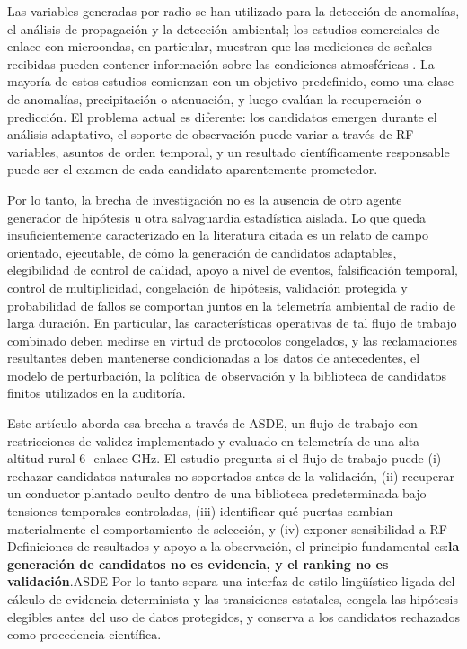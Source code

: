 \documentclass{ieeeaccess}
\begin{document}
Las variables generadas por radio se han utilizado para la detección de anomalías, el análisis de propagación y la detección ambiental; los estudios comerciales de enlace con microondas, en particular, muestran que las mediciones de señales recibidas pueden contener información sobre las condiciones atmosféricas \cite{RADIO-DT-2025,MESSER-2006,LEIJNSE-2007,UIJLENHOET-2018}. La mayoría de estos estudios comienzan con un objetivo predefinido, como una clase de anomalías, precipitación o atenuación, y luego evalúan la recuperación o predicción. El problema actual es diferente: los candidatos emergen durante el análisis adaptativo, el soporte de observación puede variar a través de RF variables, asuntos de orden temporal, y un resultado científicamente responsable puede ser el examen de cada candidato aparentemente prometedor.

Por lo tanto, la brecha de investigación no es la ausencia de otro agente generador de hipótesis u otra salvaguardia estadística aislada. Lo que queda insuficientemente caracterizado en la literatura citada es un relato de campo orientado, ejecutable, de cómo la generación de candidatos adaptables, elegibilidad de control de calidad, apoyo a nivel de eventos, falsificación temporal, control de multiplicidad, congelación de hipótesis, validación protegida y probabilidad de fallos se comportan juntos en la telemetría ambiental de radio de larga duración. En particular, las características operativas de tal flujo de trabajo combinado deben medirse en virtud de protocolos congelados, y las reclamaciones resultantes deben mantenerse condicionadas a los datos de antecedentes, el modelo de perturbación, la política de observación y la biblioteca de candidatos finitos utilizados en la auditoría.

Este artículo aborda esa brecha a través de ASDE, un flujo de trabajo con restricciones de validez implementado y evaluado en telemetría de una alta altitud rural 6- enlace GHz. El estudio pregunta si el flujo de trabajo puede (i) rechazar candidatos naturales no soportados antes de la validación, (ii) recuperar un conductor plantado oculto dentro de una biblioteca predeterminada bajo tensiones temporales controladas, (iii) identificar qué puertas cambian materialmente el comportamiento de selección, y (iv) exponer sensibilidad a RF Definiciones de resultados y apoyo a la observación, el principio fundamental es:\textbf{la generación de candidatos no es evidencia, y el ranking no es validación}.ASDE Por lo tanto separa una interfaz de estilo lingüístico ligada del cálculo de evidencia determinista y las transiciones estatales, congela las hipótesis elegibles antes del uso de datos protegidos, y conserva a los candidatos rechazados como procedencia científica.
\end{document}
